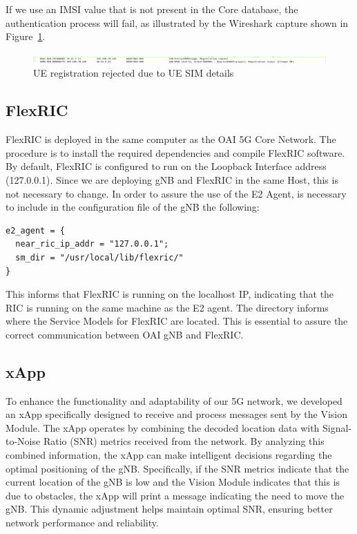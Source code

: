 If we use an IMSI value that is not present in the Core database, the authentication process will fail, as illustrated by the Wireshark capture shown in Figure~\ref{fig:UE_failure}.

\begin{figure}[H]
    \centering
    \includegraphics[width=\linewidth]{figures/Ue_fail}
    \caption{UE registration rejected due to UE SIM details}
    \label{fig:UE_failure}
\end{figure}

\subsection{FlexRIC}\label{subsec:flexric}
FlexRIC is deployed in the same computer as the OAI 5G Core Network.
The procedure is to install the required dependencies and compile FlexRIC software.
By default, FlexRIC is configured to run on the Loopback Interface address (127.0.0.1).
Since we are deploying gNB and FlexRIC in the same Host, this is not necessary to change.
In order to assure the use of the E2 Agent, is necessary to include in the configuration file of the gNB the following:

\begin{verbatim}
e2_agent = {
  near_ric_ip_addr = "127.0.0.1";
  sm_dir = "/usr/local/lib/flexric/"
}
\end{verbatim}

This informs that FlexRIC is running on the localhost IP, indicating that the RIC is running on the same machine as the E2 agent.
The directory informs where the Service Models for FlexRIC are located.
This is essential to assure the correct communication between OAI gNB and FlexRIC\@.

\subsection{xApp}\label{subsec:xapp}
To enhance the functionality and adaptability of our 5G network, we developed an xApp specifically designed to receive and process messages sent by the Vision Module.
The xApp operates by combining the decoded location data with Signal-to-Noise Ratio (SNR) metrics received from the network.
By analyzing this combined information, the xApp can make intelligent decisions regarding the optimal positioning of the gNB\@.
Specifically, if the SNR metrics indicate that the current location of the gNB is low and the Vision Module indicates that this is due to obstacles, the xApp will print a message indicating the need to move the gNB.
This dynamic adjustment helps maintain optimal SNR, ensuring better network performance and reliability.


